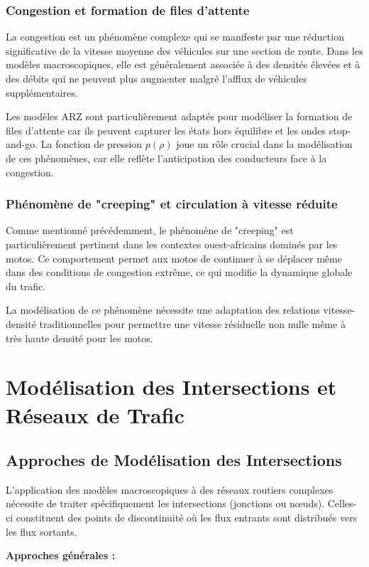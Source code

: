 \subsubsection{Congestion et formation de files d'attente}
La congestion est un phénomène complexe qui se manifeste par une réduction significative de la vitesse moyenne des véhicules sur une section de route. Dans les modèles macroscopiques, elle est généralement associée à des densités élevées et à des débits qui ne peuvent plus augmenter malgré l'afflux de véhicules supplémentaires.

Les modèles ARZ sont particulièrement adaptés pour modéliser la formation de files d'attente car ils peuvent capturer les états hors équilibre et les ondes stop-and-go. La fonction de pression $p(\rho)$ joue un rôle crucial dans la modélisation de ces phénomènes, car elle reflète l'anticipation des conducteurs face à la congestion.

\subsubsection{Phénomène de "creeping" et circulation à vitesse réduite}
Comme mentionné précédemment, le phénomène de "creeping" est particulièrement pertinent dans les contextes ouest-africains dominés par les motos. Ce comportement permet aux motos de continuer à se déplacer même dans des conditions de congestion extrême, ce qui modifie la dynamique globale du trafic.

La modélisation de ce phénomène nécessite une adaptation des relations vitesse-densité traditionnelles pour permettre une vitesse résiduelle non nulle même à très haute densité pour les motos.

\section{Modélisation des Intersections et Réseaux de Trafic}
\subsection{Approches de Modélisation des Intersections}
L'application des modèles macroscopiques à des réseaux routiers complexes nécessite de traiter spécifiquement les intersections (jonctions ou nœuds). Celles-ci constituent des points de discontinuité où les flux entrants sont distribués vers les flux sortants.

\textbf{Approches générales :}

